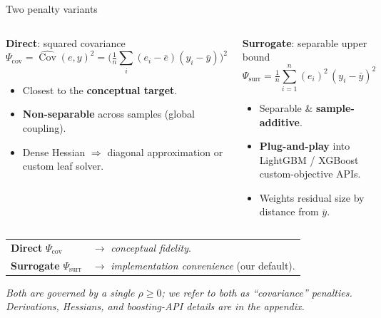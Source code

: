 \documentclass[aspectratio=169,12pt,]{beamer}
\newcommand{\Cov}{\operatorname{Cov}}
\newcommand{\1}{\mathbf{1}}
\begin{document}
\begin{frame}{Two penalty variants}

\vspace{-1mm}
\begin{columns}[T,onlytextwidth]
\begin{block}{\textbf{Direct}: squared covariance}
\vspace{-4mm}
\[
\Psi_{\text{cov}} = \widehat{\Cov}(e, y)^2
= \Big(\tfrac{1}{n}\sum_i (e_i - \bar e)(y_i - \bar y)\Big)^2
\]
\begin{itemize}
    \item {} Closest to the \textbf{conceptual target}.
    \item {} \textbf{Non-separable} across samples (global coupling).
    \item {} Dense Hessian $\Rightarrow$ diagonal approximation or custom leaf solver.
\end{itemize}
\end{block}

\begin{block}{\textbf{Surrogate}: separable upper bound}
\vspace{-4mm}
\[
\Psi_{\text{surr}} = \tfrac{1}{n}\sum_{i=1}^n (e_i)^2\,(y_i - \bar y)^2
\]
\begin{itemize}
    \item {} Separable \& \textbf{sample-additive}.
    \item {} \textbf{Plug-and-play} into LightGBM / XGBoost custom-objective APIs.
    \item {} Weights residual size by distance from $\bar y$.
\end{itemize}
\end{block}
\end{columns}

\vspace{3mm}

\begin{center}
\small
\begin{tabular}{ll}
\textbf{Direct} $\Psi_{\text{cov}}$   & $\rightarrow$ \emph{conceptual fidelity}.\\
\textbf{Surrogate} $\Psi_{\text{surr}}$ & $\rightarrow$ \emph{implementation convenience} (our default).
\end{tabular}
\end{center}

{\footnotesize\itshape
Both are governed by a single $\rho \ge 0$; we refer to both as ``covariance'' penalties. Derivations, Hessians, and boosting-API details are in the appendix.
}

\end{frame}
\end{document}
